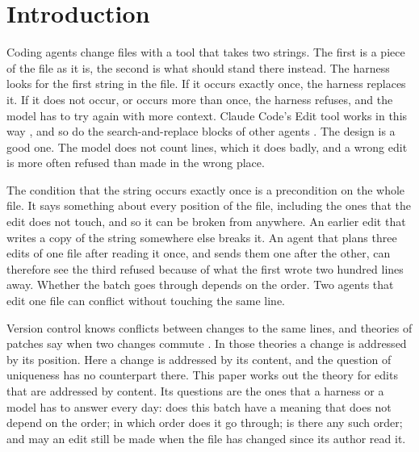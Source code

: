 \documentclass[acmsmall,nonacm,screen]{acmart}
\begin{document}
\section{Introduction}

Coding agents change files with a tool that takes two strings. The first is a piece of the
file as it is, the second is what should stand there instead. The harness looks for the first
string in the file. If it occurs exactly once, the harness replaces it. If it does not occur,
or occurs more than once, the harness refuses, and the model has to try again with more
context. Claude Code's Edit tool works in this way \citep{claudecodetools}, and so do the
search-and-replace blocks of other agents \citep{aider}. The design is a good one. The model
does not count lines, which it does badly, and a wrong edit is more often refused than made
in the wrong place.

The condition that the string occurs exactly once is a precondition on the whole file. It
says something about every position of the file, including the ones that the edit does not
touch, and so it can be broken from anywhere. An earlier edit that writes a copy of the string
somewhere else breaks it. An agent that plans three edits of one file after reading it once,
and sends them one after the other, can therefore see the third refused because of what the
first wrote two hundred lines away. Whether the batch goes through depends on the order. Two
agents that edit one file can conflict without touching the same line.

Version control knows conflicts between changes to the same lines, and theories of patches
say when two changes commute \citep{Mimram2013,Angiuli2014}. In those theories a change is
addressed by its position. Here a change is addressed by its content, and the question of
uniqueness has no counterpart there. This paper works out the theory for edits that are
addressed by content. Its questions are the ones that a harness or a model has to answer
every day: does this batch have a meaning that does not depend on the order; in which order
does it go through; is there any such order; and may an edit still be made when the file has
changed since its author read it.
\end{document}
